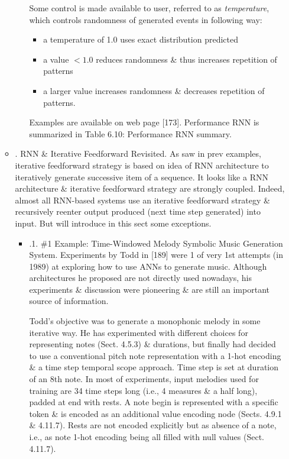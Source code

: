 \documentclass{article}
\begin{document}
\begin{itemize}
\begin{itemize}
\begin{itemize}
			Some control is made available to user, referred to as {\it temperature}, which controls randomness of generated events in following way:
			\begin{itemize}
				\item a temperature of 1.0 uses exact distribution predicted
				\item a value $< 1.0$ reduces randomness \& thus increases repetition of patterns
				\item a larger value increases randomness \& decreases repetition of patterns.
			\end{itemize}
			Examples are available on web page [173]. Performance RNN is summarized in {\sf Table 6.10: Performance RNN summary}.
		\end{itemize}
		\item {. RNN \& Iterative Feedforward Revisited.} As saw in prev examples, iterative feedforward strategy is based on idea of RNN architecture to iteratively generate successive item of a sequence. It looks like a RNN architecture \& iterative feedforward strategy are strongly coupled. Indeed, almost all RNN-based systems use an iterative feedforward strategy \& recursively reenter output produced (next time step generated) into input. But will introduce in this sect some exceptions.
		\begin{itemize}
			\item {.1. \#1 Example: Time-Windowed Melody Symbolic Music Generation System.} Experiments by {\sc Todd} in [189] were 1 of very 1st attempts (in 1989) at exploring how to use ANNs to generate music. Although architectures he proposed are not directly used nowadays, his experiments \& discussion were pioneering \& are still an important source of information.

			{\sf Todd}'s objective was to generate a monophonic melody in some iterative way. He has experimented with different choices for representing notes (Sect. 4.5.3) \& durations, but finally had decided to use a conventional pitch note representation with a 1-hot encoding \& a time step temporal scope approach. Time step is set at duration of an 8th note. In most of experiments, input melodies used for training are 34 time steps long (i.e., 4 measures \& a half long), padded at end with rests. A note begin is represented with a specific token \& is encoded as an additional value encoding node (Sects. 4.9.1 \& 4.11.7). Rests are not encoded explicitly but as absence of a note, i.e., as note 1-hot encoding being all filled with null values (Sect. 4.11.7).


\end{itemize}
\end{itemize}
\end{itemize}
\end{document}

